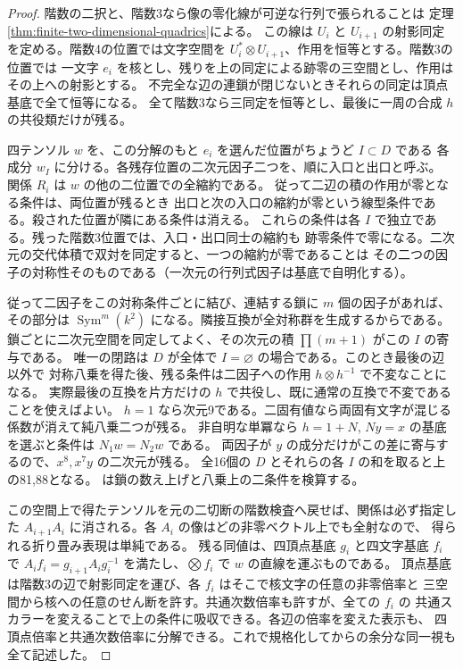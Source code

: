 \begin{proof}
階数の二択と、階数3なら像の零化線が可逆な行列で張られることは
定理\ref{thm:finite-two-dimensional-quadrics}による。
この線は $U_i$ と $U_{i+1}$ の射影同定を定める。階数4の位置では文字空間を
$U_i^*\otimes U_{i+1}$、作用を恒等とする。階数3の位置では
一文字 $e_i$ を核とし、残りを上の同定による跡零の三空間とし、作用はその上への射影とする。
不完全な辺の連鎖が閉じないときそれらの同定は頂点基底で全て恒等になる。
全て階数3なら三同定を恒等とし、最後に一周の合成 $h$ の共役類だけが残る。

四テンソル $w$ を、この分解のもと $e_i$ を選んだ位置がちょうど $I\subset D$ である
各成分 $w_I$ に分ける。各残存位置の二次元因子二つを、順に入口と出口と呼ぶ。
関係 $R_i$ は $w$ の他の二位置での全縮約である。
従って二辺の積の作用が零となる条件は、両位置が残るとき
出口と次の入口の縮約が零という線型条件である。殺された位置が隣にある条件は消える。
これらの条件は各 $I$ で独立である。残った階数3位置では、入口・出口同士の縮約も
跡零条件で零になる。二次元の交代体積で双対を同定すると、一つの縮約が零であることは
その二つの因子の対称性そのものである（一次元の行列式因子は基底で自明化する）。

従って二因子をこの対称条件ごとに結び、連結する鎖に $m$ 個の因子があれば、
その部分は $\operatorname{Sym}^m(k^2)$ になる。隣接互換が全対称群を生成するからである。
鎖ごとに二次元空間を同定してよく、その次元の積 $\prod(m+1)$ がこの $I$ の寄与である。
唯一の閉路は $D$ が全体で $I=\varnothing$ の場合である。このとき最後の辺以外で
対称八乗を得た後、残る条件は二因子への作用 $h\otimes h^{-1}$ で不変なことになる。
実際最後の互換を片方だけの $h$ で共役し、既に通常の互換で不変であることを使えばよい。
$h=1$ なら次元9である。二固有値なら両固有文字が混じる係数が消えて純八乗二つが残る。
非自明な単冪なら $h=1+N$, $Ny=x$ の基底を選ぶと条件は $N_1w=N_2w$ である。
両因子が $y$ の成分だけがこの差に寄与するので、$x^8,x^7y$ の二次元が残る。
全16個の $D$ とそれらの各 $I$ の和を取ると上の81,88となる。
 は鎖の数え上げと八乗上の二条件を検算する。

この空間上で得たテンソルを元の二切断の階数検査へ戻せば、関係は必ず指定した
$A_{i+1}A_i$ に消される。各 $A_i$ の像はどの非零ベクトル上でも全射なので、
得られる折り畳み表現は単純である。
残る同値は、四頂点基底 $g_i$ と四文字基底 $f_i$ で
$A_i f_i=g_{i+1}A_i g_i^{-1}$ を満たし、$\bigotimes f_i$ で $w$ の直線を運ぶものである。
頂点基底は階数3の辺で射影同定を運び、各 $f_i$ はそこで核文字の任意の非零倍率と
三空間から核への任意のせん断を許す。共通次数倍率も許すが、全ての $f_i$ の
共通スカラーを変えることで上の条件に吸収できる。各辺の倍率を変えた表示も、
四頂点倍率と共通次数倍率に分解できる。これで規格化してからの余分な同一視も全て記述した。
\end{proof}

